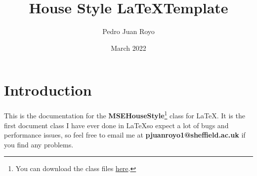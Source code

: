 \documentclass[headers1]{MSEHouseStyle}
\title{House Style \LaTeX \space Template}
\author{Pedro Juan Royo}
\date{March 2022}
\begin{document}

\maketitle

\tableofcontents

\section{Introduction}
\noindent
This is the documentation for the \textbf{MSEHouseStyle}\footnote{You can download the class files \href{https://github.com/Parzival1918/MSEHouseStyle}{here}.} class for \LaTeX. It is the first document class I have ever done in \LaTeX\space so expect a lot of bugs and performance issues, so feel free to email me at \textbf{pjuanroyo1@sheffield.ac.uk} if you find any problems.
\end{document}

